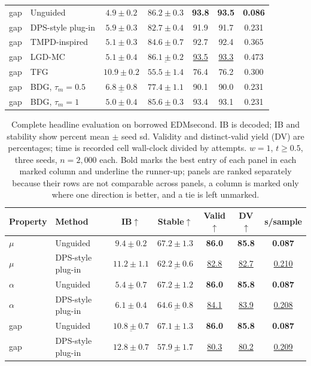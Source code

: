 \documentclass{article}
\begin{document}
\begin{table}[!htbp]
\begin{tabular}{llccccc}
\midrule
gap & Unguided & $4.9\pm0.2$ & $\mathbf{86.2\pm0.3}$& \textbf{93.8}& \textbf{93.5}& \textbf{0.086}\\
gap & DPS-style plug-in & $5.9\pm0.3$ & $82.7\pm0.4$ & 91.9 & 91.7 & 0.231\\
gap & TMPD-inspired & $5.1\pm0.3$ & $84.6\pm0.7$ & 92.7 & 92.4 & 0.365\\
gap & LGD-MC & $5.1\pm0.4$ & $\underline{86.1\pm0.2}$& \underline{93.5}& \underline{93.3}& 0.473\\
gap & TFG & $\mathbf{10.9\pm0.2}$& $55.5\pm1.4$ & 76.4 & 76.2 & 0.300\\
gap & BDG, $\tau_m=0.5$ & $\underline{6.8\pm0.8}$& $77.4\pm1.1$ & 90.1 & 90.0 & 0.231\\
gap & BDG, $\tau_m=1$ & $5.0\pm0.4$ & $85.6\pm0.3$ & 93.4 & 93.1 & 0.231\\
\bottomrule
\end{tabular}
\end{table}
\begin{table}[!htbp]
\centering\small
\caption{Complete headline evaluation on borrowed EDMsecond. IB is decoded; IB and stability show percent mean $\pm$ seed sd. Validity and distinct-valid yield (DV) are percentages; time is recorded cell wall-clock divided by attempts. $w=1$, $t\ge0.5$, three seeds, $n=2{,}000$ each. Bold marks the best entry of each panel in each marked column and underline the runner-up; panels are ranked separately because their rows are not comparable across panels, a column is marked only where one direction is better, and a tie is left unmarked.}
\label{tab:full-edm}
\begin{tabular}{llccccc}
\toprule
Property & Method & IB$\uparrow$ & Stable$\uparrow$ & Valid$\uparrow$ & DV$\uparrow$ & s/sample\\
\midrule
$\mu$ & Unguided & $\underline{9.4\pm0.2}$& $\mathbf{67.2\pm1.3}$& \textbf{86.0}& \textbf{85.8}& \textbf{0.087}\\
$\mu$ & DPS-style plug-in & $\mathbf{11.2\pm1.1}$& $\underline{62.2\pm0.6}$& \underline{82.8}& \underline{82.7}& \underline{0.210}\\
\midrule
$\alpha$ & Unguided & $\underline{5.4\pm0.7}$& $\mathbf{67.2\pm1.2}$& \textbf{86.0}& \textbf{85.8}& \textbf{0.087}\\
$\alpha$ & DPS-style plug-in & $\mathbf{6.1\pm0.4}$& $\underline{64.6\pm0.8}$& \underline{84.1}& \underline{83.9}& \underline{0.208}\\
\midrule
gap & Unguided & $\underline{10.8\pm0.7}$& $\mathbf{67.1\pm1.3}$& \textbf{86.0}& \textbf{85.8}& \textbf{0.087}\\
gap & DPS-style plug-in & $\mathbf{12.8\pm0.7}$& $\underline{57.9\pm1.7}$& \underline{80.3}& \underline{80.2}& \underline{0.209}\\
\bottomrule
\end{tabular}
\end{table}
\end{document}
